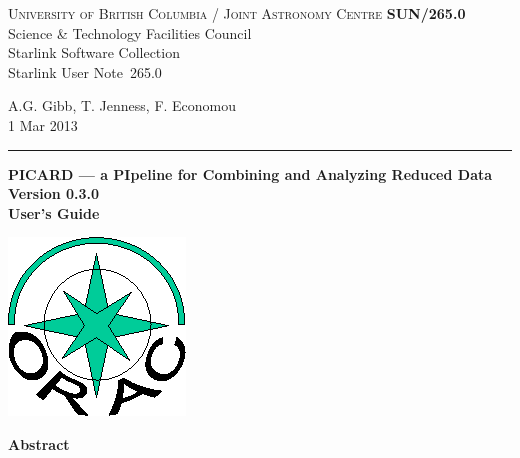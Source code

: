 \documentclass[twoside,11pt]{article}
\newcommand{\stardoccategory}  {Starlink User Note}
\newcommand{\stardocinitials}  {SUN}
\newcommand{\stardocnumber}    {265.0}
\newcommand{\stardocauthors}   {A.G. Gibb, T. Jenness, F. Economou}
\newcommand{\stardocdate}      {1 Mar 2013}
\newcommand{\stardoctitle}     {PICARD --- a PIpeline for Combining and Analyzing Reduced Data}
\newcommand{\stardocversion}   {Version 0.3.0}
\newcommand{\stardocmanual}    {User's Guide}
\newcommand{\stardocname}{\stardocinitials /\stardocnumber}
\newenvironment{latexonly}{}{}
\renewcommand{\_}{\texttt{\symbol{95}}}
\begin{document}
\thispagestyle{empty}

\begin{latexonly}
   \textsc{University of British Columbia} / \textsc{Joint Astronomy Centre} \hfill \textbf{\stardocname}\\
   {\large Science \& Technology Facilities Council}\\
   {\large Starlink Software Collection\\}
   {\large \stardoccategory\ \stardocnumber}
   \begin{flushright}
   \stardocauthors\\
   \stardocdate
   \end{flushright}
   \vspace{-4mm}
   \rule{\textwidth}{0.5mm}
   \vspace{5mm}
   \begin{center}
   {\Huge\textbf{\stardoctitle \\ [2.5ex]}}
   {\LARGE\textbf{\stardocversion \\ [4ex]}}
   {\Huge\textbf{\stardocmanual}}
   \end{center}
   \vspace{5mm}

\begin{center}
\includegraphics[scale=0.3]{sun265_logo}
\end{center}

   \vspace{10mm}
   \begin{center}
      {\Large\textbf{Abstract}}
   \end{center}
\end{latexonly}
\end{document}
